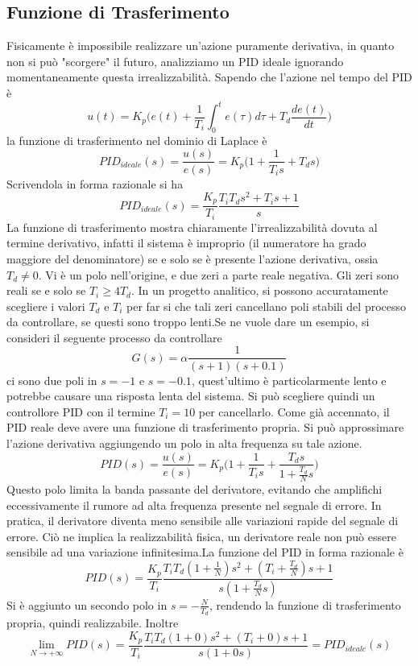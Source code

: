 \documentclass[10pt, letterpaper]{report}
\begin{document}
\subsection{Funzione di Trasferimento}
Fisicamente è impossibile realizzare un'azione puramente derivativa, in quanto non si può "scorgere" il futuro, analizziamo un PID ideale ignorando momentaneamente questa irrealizzabilità. Sapendo che l'azione nel tempo del PID è 
$$ 
u(t)=K_p\Big(   e(t)+\frac{1}{T_i}\int_0^te(\tau)d\tau + T_d\frac{de(t)}{dt}    \Big)
$$
la funzione di trasferimento nel dominio di Laplace è 
$$ PID_{ideale}(s)=\frac{u(s)}{e(s)}= 
K_p\Big(1+\frac{1}{T_i s}+T_d s\Big)
$$
Scrivendola in forma razionale si ha 
$$  PID_{ideale}(s)= 
\frac{K_p}{T_i}\frac{T_iT_ds^2+T_is+1}{s}
$$
La funzione di trasferimento mostra chiaramente l'irrealizzabilità dovuta al termine derivativo, infatti il sistema è improprio (il numeratore ha grado maggiore del denominatore) se e solo se è presente l'azione derivativa, ossia $T_d\ne 0$.\acc 
Vi è un polo nell'origine, e due zeri a parte reale negativa. Gli zeri sono reali se e solo se $T_i\ge 4T_d$.\acc 
In un progetto analitico, si possono accuratamente scegliere i valori $T_d$ e $T_i$ per far si che tali zeri cancellano poli stabili del processo da controllare, se questi sono troppo lenti.\acc  Se ne vuole dare un esempio, si consideri il seguente processo da controllare 
$$ G(s)=\alpha\frac{1}{(s+1)(s+0.1)}$$
ci sono due poli in $s=-1$ e $s=-0.1$, quest'ultimo è particolarmente lento e potrebbe causare una risposta lenta del sistema. Si può scegliere quindi un controllore PID con il termine $T_i=10$ per cancellarlo.\acc 
Come già accennato, il PID reale deve avere una funzione di trasferimento propria. Si può approssimare l'azione derivativa aggiungendo un polo in alta frequenza su tale azione. 
$$ PID(s)=\frac{u(s)}{e(s)}= 
K_p\Big(1+\frac{1}{T_i s}+\dfrac{T_d s}{1+\frac{T_d}{N}s}\Big)
$$
Questo polo limita la banda passante del derivatore, evitando che amplifichi eccessivamente il rumore ad alta frequenza presente nel segnale di errore. In pratica, il derivatore diventa meno sensibile alle variazioni rapide del segnale di errore. Ciò ne implica la realizzabilità fisica, un derivatore reale non può essere sensibile ad una variazione infinitesima.\acc  La funzione del PID in forma razionale è 
$$ 
PID(s)=\frac{K_p}{T_i}\frac{T_iT_d(1+\frac{1}{N})s^2+(T_i+\frac{T_d}{N})s+1}{s(1+\frac{T_d}{N}s)}
$$
Si è aggiunto un secondo polo in $s=-\frac{N}{T_d}$, rendendo la funzione di trasferimento propria, quindi realizzabile. Inoltre 
$$ \lim_{N\rightarrow +\infty}PID(s)= 
\frac{K_p}{T_i}\frac{T_iT_d(1+0)s^2+(T_i+0)s+1}{s(1+0s)}
=PID_{ideale}(s)$$
\end{document}
